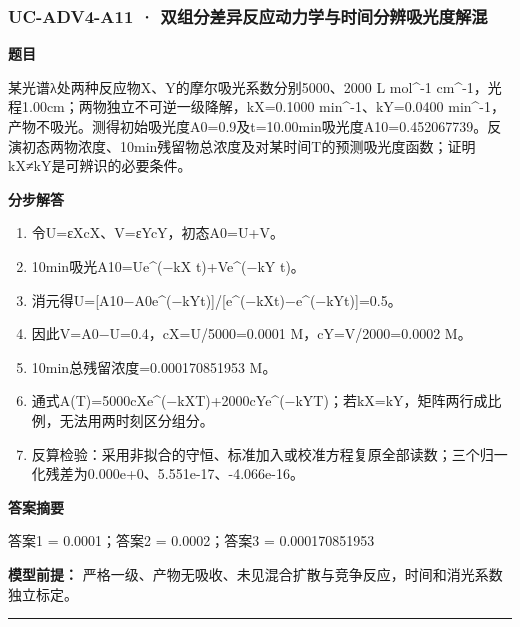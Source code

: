 \documentclass[UTF8,11pt,a4paper]{ctexart}
\begin{document}
\subsubsection*{UC-ADV4-A11 · 双组分差异反应动力学与时间分辨吸光度解混}
\noindent\textbf{题目}\par
某光谱λ处两种反应物X、Y的摩尔吸光系数分别5000、2000 L mol\textasciicircum{}-1 cm\textasciicircum{}-1，光程1.00cm；两物独立不可逆一级降解，kX=0.1000 min\textasciicircum{}-1、kY=0.0400 min\textasciicircum{}-1，产物不吸光。测得初始吸光度A0=0.9及t=10.00min吸光度A10=0.452067739。反演初态两物浓度、10min残留物总浓度及对某时间T的预测吸光度函数；证明kX≠kY是可辨识的必要条件。\par
\medskip\noindent\textbf{分步解答}
\begin{enumerate}
\item 令U=εXcX、V=εYcY，初态A0=U+V。
\item 10min吸光A10=Ue\textasciicircum{}(−kX t)+Ve\textasciicircum{}(−kY t)。
\item 消元得U=[A10−A0e\textasciicircum{}(−kYt)]/[e\textasciicircum{}(−kXt)−e\textasciicircum{}(−kYt)]=0.5。
\item 因此V=A0−U=0.4，cX=U/5000=0.0001 M，cY=V/2000=0.0002 M。
\item 10min总残留浓度=0.000170851953 M。
\item 通式A(T)=5000cXe\textasciicircum{}(−kXT)+2000cYe\textasciicircum{}(−kYT)；若kX=kY，矩阵两行成比例，无法用两时刻区分组分。
\item 反算检验：采用非拟合的守恒、标准加入或校准方程复原全部读数；三个归一化残差为0.000e+0、5.551e-17、-4.066e-16。
\end{enumerate}
\noindent\textbf{答案摘要}\par
答案1 = 0.0001；答案2 = 0.0002；答案3 = 0.000170851953\par
\noindent\textbf{模型前提：}
严格一级、产物无吸收、未见混合扩散与竞争反应，时间和消光系数独立标定。\par
\medskip\hrule\medskip
{}
\end{document}
